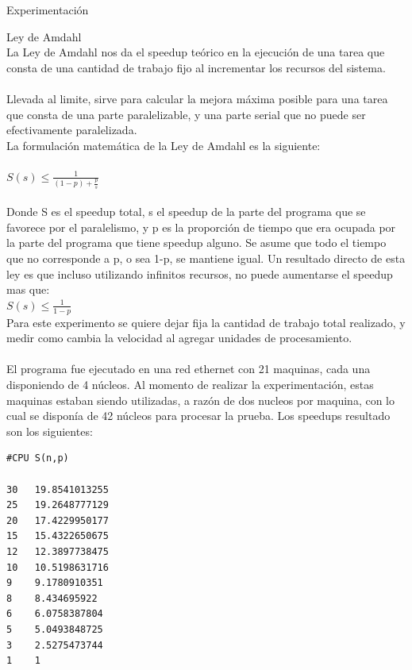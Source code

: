 \begin{section}{Experimentación}
\begin{subsection}{Ley de Amdahl}
~\\
La Ley de Amdahl nos da el speedup teórico en la ejecución de una tarea que consta de una cantidad de trabajo fijo al incrementar los recursos del sistema.
~\\
~\\
Llevada al limite, sirve para calcular la mejora máxima posible para una tarea que consta de una parte paralelizable, y una parte serial que no puede ser efectivamente paralelizada.
~\\
La formulación matemática de la Ley de Amdahl es la siguiente:
~\\
~\\
$S(s) \leq  \frac{1}{(1-p)+\frac{p}{s}}$
~\\
~\\
Donde S es el speedup total, s el speedup de la parte del programa que se favorece por el paralelismo, y p es la proporción de tiempo que era ocupada por la parte del programa que tiene speedup alguno. Se asume que todo el tiempo que no corresponde a p, o sea 1-p, se mantiene igual. Un resultado directo de esta ley es que incluso utilizando infinitos recursos, no puede aumentarse el speedup mas que:
~\\

$S(s) \leq  \frac{1}{1-p}$
~\\

Para este experimento se quiere dejar fija la cantidad de trabajo total realizado, y medir como cambia la velocidad al agregar unidades de procesamiento. 
~\\
~\\
El programa fue ejecutado en una red ethernet con 21 maquinas, cada una disponiendo de 4 núcleos. Al momento de realizar la experimentación, estas maquinas estaban siendo utilizadas, a razón de dos nucleos por maquina, con lo cual se disponía de 42 núcleos para procesar la prueba. Los speedups resultado son los siguientes:
~\\
\begin{minipage}{\linewidth}
\begin{tcolorbox}[colback=blue!5!white,colframe=blue!75!black,title=Speedup]
\begin{verbatim}
#CPU S(n,p)

30   19.8541013255
25   19.2648777129
20   17.4229950177
15   15.4322650675
12   12.3897738475
10   10.5198631716
9    9.1780910351
8    8.434695922
6    6.0758387804
5    5.0493848725
3    2.5275473744
1    1


\end{verbatim}
\end{tcolorbox}
\end{minipage}
\end{subsection}
\end{section}
